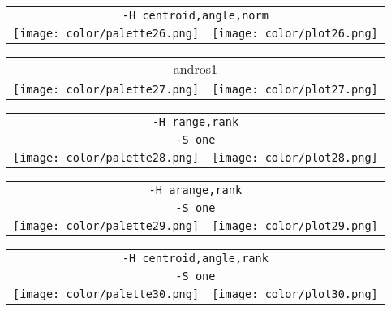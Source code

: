 \documentclass{article}
\begin{document}
\begin{center}
\begin{tabular}{m{8cm}m{8cm}}
\multicolumn{2}{c}{\tt -H centroid,angle,norm} \\
\texttt{[image: color/palette26.png]} &
\texttt{[image: color/plot26.png]}
\end{tabular}
\end{center}

\begin{center}
\begin{tabular}{m{8cm}m{8cm}}
\multicolumn{2}{c}{andros1} \\
\texttt{[image: color/palette27.png]} &
\texttt{[image: color/plot27.png]}
\end{tabular}
\end{center}

\begin{center}
\begin{tabular}{m{8cm}m{8cm}}
\multicolumn{2}{c}{\tt -H range,rank} \\
\multicolumn{2}{c}{\tt -S one} \\
\texttt{[image: color/palette28.png]} &
\texttt{[image: color/plot28.png]}
\end{tabular}
\end{center}

\begin{center}
\begin{tabular}{m{8cm}m{8cm}}
\multicolumn{2}{c}{\tt -H arange,rank} \\
\multicolumn{2}{c}{\tt -S one} \\
\texttt{[image: color/palette29.png]} &
\texttt{[image: color/plot29.png]}
\end{tabular}
\end{center}

\begin{center}
\begin{tabular}{m{8cm}m{8cm}}
\multicolumn{2}{c}{\tt -H centroid,angle,rank} \\
\multicolumn{2}{c}{\tt -S one} \\
\texttt{[image: color/palette30.png]} &
\texttt{[image: color/plot30.png]}
\end{tabular}
\end{center}
\end{document}
